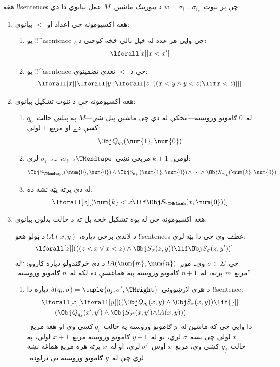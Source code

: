 \documentclass[../../../include/open-logic-section]{subfiles}
\begin{document}
هغه !!{sentence}s چې پر ننوت~$w = \sigma_{i_1}\dots\sigma_{i_k}$
د ټيورينګ ماشين~$M$ عمل بيانوي دا دي:
\begin{enumerate}
\item هغه اکسيومونه چې اعداد او~$<$ بيانوي:
\begin{enumerate}
\item يو !!^a{sentence} چې وايي هر عدد له خپل تالي څخه کوچنی دے:
\[
\lforall[x][x < x']
\]
\item يو !!^a{sentence} چې د~$<$ تعدي تضمينوي:
\[
\lforall[x][\lforall[y][\lforall[z][
      ((x < y \land y < z) \lif x < z)]]]
\]
\end{enumerate}
\item هغه اکسيومونه چې د ننوت تشکيل بيانوي:
\begin{enumerate}
\item له~$0$ ګامونو وروسته---مخکې له دې چې ماشين پيل شي---$M$ په
  پيلني حالت~$q_0$ کښې دے او مربع~$1$ لولي:
\[
\Obj Q_{q_0}(\num{1}, \num{0})
\]
\item لومړۍ $k+1$ مربعې نښې~$\TMendtape$، $\sigma_{i_1}$، \dots،
  $\sigma_{i_k}$ لري:
\[
\Obj S_\TMendtape(\num{0}, \num{0}) \land
\Obj S_{\sigma_{i_1}}(\num{1}, \num{0}) \land
\dots \land
\Obj S_{\sigma_{i_k}}(\num{k}, \num{0})
\]
\item له دې پرته پټه تشه ده:
\[
\lforall[x][(\num{k} < x \lif \Obj S_\TMblank(x, \num{0}))]
\]
\end{enumerate}
\item هغه اکسيومونه چې له يوه تشکيل څخه بل ته د حالت بدلون بيانوي:

د لاندې برخې دپاره، $!A(x, y)$ د ټولو هغو !!{sentence}s عطف وي چې
دا بڼه لري:
\[
\lforall[z][
  (((z < x \lor x < z) \land \Obj S_\sigma(z, y))
  \lif \Obj S_\sigma(z, y'))]
\]
چې~$\sigma \in \Sigma$ وي۔ موږ~$!A(\num{m},\num{n})$ د دې څرګندولو
دپاره کاروو: ``له مربع~$m$ پرته، له~$n+1$ ګامونو وروسته پټه هماغسې
ده لکه له~$n$ ګامونو وروسته۔''
\begin{enumerate}
\item {} د هرې لارښوونې~$\delta(q_i, \sigma) =
  \tuple{q_j, \sigma', \TMright}$ دپاره دا !!{sentence}:
\begin{align*}
& \lforall[x][\lforall[y][(
   (\Obj Q_{q_i}(x, y) \land \Obj S_{\sigma}(x, y)) \lif {}]] \\
&\qquad   (\Obj Q_{q_j}(x', y') \land \Obj S_{\sigma'}(x, y') \land
!A(x, y)))
\end{align*}
دا وايي چې که ماشين له~$y$ ګامونو وروسته په حالت~$q_i$ کښې وي او
هغه مربع~$x$ لولي چې نښه~$\sigma$ لري، نو له~$y+1$ ګامونو وروسته
مربع~$x+1$ لولي، په حالت~$q_j$ کښې وي، مربع~$x$ اوس~$\sigma'$ لري،
او له~$x$ پرته هره مربع هماغه نښه لري چې له~$y$ ګامونو وروسته ئې
درلوده۔


\end{enumerate}
\end{enumerate}
\end{document}
